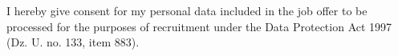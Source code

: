 \documentclass[11pt, a4paper]{awesome-cv}
\begin{document}
  \makecvheader

  \makecvfooter
  {}
  {I hereby give consent for my personal data included in the job offer to be processed for the purposes of recruitment under the Data Protection Act 1997 (Dz. U. no. 133, item 883).}
  {}

  
  
  
  

\end{document}
